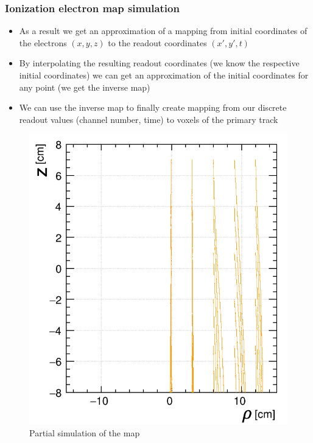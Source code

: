 \documentclass{beamer}
\begin{document}
	\begin{frame}
		\frametitle{Ionization electron map simulation}
		\begin{itemize}
			\item As a result we get an approximation of a mapping from initial coordinates of the electrons $(x,y,z)$ to the readout coordinates $(x',y',t)$
			\item By interpolating the resulting readout coordinates (we know the respective initial coordinates) we can get an approximation of the initial coordinates for any point (we get the inverse map)
			\item We can use the inverse map to finally create mapping from our discrete readout values (channel number, time) to voxels of the primary track
		\end{itemize}
		\begin{figure}
			\centering
			\includegraphics[height=0.4\textheight]{images/map_lines.png}
			\caption{Partial simulation of the map}
		\end{figure}
	\end{frame}
\end{document}
